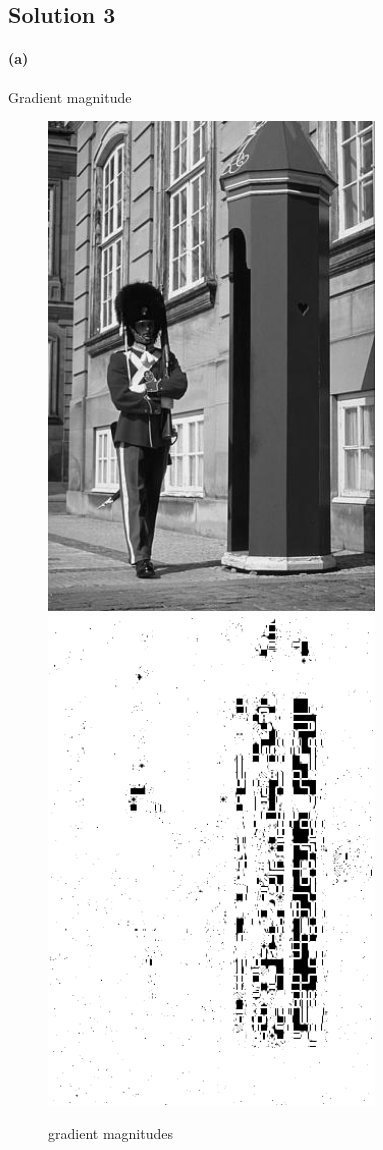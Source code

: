 \documentclass{article}
\newcommand{\solution}[1]{\clearpage \subsection*{Solution #1}}  %
\newcommand{\spart}[1]{\paragraph{(#1)}}
\begin{document}
\solution{3}
\spart{a} Gradient magnitude
\begin{figure}[h!]
  \centering
  	\includegraphics[height=35em]{code/inputs/p3_inp.png}
	\includegraphics[height=35em]{code/outputs/prob3_a.png}
  \caption{gradient magnitudes}
\end{figure}
\end{document}
